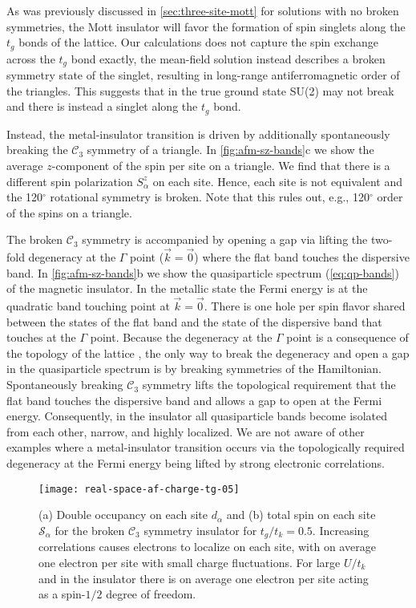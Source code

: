 \documentclass[reprint,aps,prb,amsmath,amssymb]{revtex4-2}
\begin{document}
As was previously discussed in \cref{sec:three-site-mott} for solutions with no broken symmetries, the Mott insulator will favor the formation of spin singlets along the $t_g$ bonds of the lattice. Our calculations does not capture the spin exchange across the $t_g$ bond exactly, the mean-field solution instead describes a broken symmetry state of the singlet, resulting in long-range antiferromagnetic order of the triangles. This suggests that in the true ground state SU(2) may not break and there is instead a singlet along the $t_g$ bond.

Instead, the metal-insulator transition is driven by additionally spontaneously breaking the $\mathcal{C}_3$ symmetry of a triangle. In \cref{fig:afm-sz-bands}c we show the average $z$-component of the spin per site on a triangle. We find that there is a different spin polarization $S_{\alpha}^z$ on each site. Hence, each site is not equivalent and the 120$^{\circ}$ rotational symmetry is broken. Note that this rules out, e.g., 120$^{\circ}$ order of the spins on a triangle. 

The broken $\mathcal{C}_3$ symmetry is accompanied by opening a gap via lifting the two-fold degeneracy at the $\Gamma$ point ($\vec{k}=\vec{0}$) where the flat band touches the dispersive band. In \cref{fig:afm-sz-bands}b we show the quasiparticle spectrum (\cref{eq:qp-bands}) of the magnetic insulator. In the metallic state the Fermi energy is at the quadratic band touching point at $\vec{k} = \vec{0}$. There is one hole per spin flavor shared between the states of the flat band and the state of the dispersive band that touches at the $\Gamma$ point. Because the degeneracy at the $\Gamma$ point is a consequence of the topology of the lattice \cite{Bergman2008,Jacko2015}, the only way to break the degeneracy and open a gap in the quasiparticle spectrum is by breaking symmetries of the Hamiltonian. Spontaneously breaking $\mathcal{C}_3$ symmetry lifts the topological requirement that the flat band touches the dispersive band and allows a gap to open at the Fermi energy. Consequently, in the insulator all quasiparticle bands become isolated from each other, narrow, and highly localized. We are not aware of other examples where a metal-insulator transition occurs via the topologically required degeneracy at the Fermi energy being lifted by strong electronic correlations.

\begin{figure}
	\centering
	\texttt{[image: real-space-af-charge-tg-05]}
	\caption
	{\label{fig:af-d-S}
		(a) Double occupancy on each site $d_{\alpha}$ and (b) total spin on each site $\mathcal{S}_{\alpha}$ for the broken $\mathcal{C}_3$ symmetry insulator for $t_g/t_k = 0.5$.
		Increasing correlations causes electrons to localize on each site, with on average one electron per site with small charge fluctuations. For large $U / t_k$ and in the insulator there is on average one electron per site acting as a spin-$1/2$ degree of freedom.
	}
\end{figure}
\end{document}
